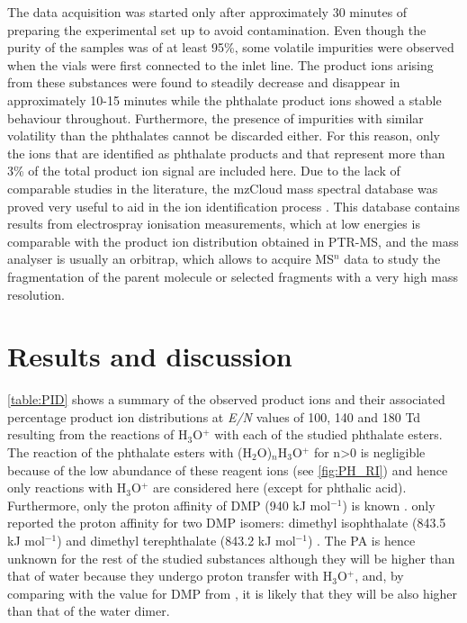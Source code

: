The data acquisition was started only after approximately 30 minutes of preparing the experimental set up to avoid contamination.
%
Even though the purity of the samples was of at least 95\%, some volatile impurities were observed when the vials were first connected to the inlet line.
%
The product ions arising from these substances were found to steadily decrease and disappear in approximately 10-15 minutes while the phthalate product ions showed a stable behaviour throughout.
%
Furthermore, the presence of impurities with similar volatility than the phthalates cannot be discarded either. 
%
For this reason, only the  ions that are identified as phthalate products and that represent more than 3\% of the total product ion signal are included here.
%
Due to the lack of comparable studies in the literature, the mzCloud mass spectral database was proved very useful to aid in the ion identification process \cite{mzcloudd}.
%
 This database contains results from electrospray ionisation measurements, which at low energies is comparable with the product ion distribution obtained in PTR-MS, and the mass analyser is usually an orbitrap, which allows to acquire MS$^n$ data  to study the fragmentation of the parent molecule or selected fragments with a very high mass resolution.%







\section{Results and discussion}
\autoref{table:PID} shows a summary of the observed product ions and their associated percentage product ion distributions at \textit{E/N} values of 100, 140 and 180 Td resulting from the reactions of H$_3$O$^+$ with each of the studied phthalate esters. 
%
The reaction of the phthalate esters with (H$_2$O)$_n$H$_3$O$^+$ for n>0 is negligible because of the low abundance of these reagent ions (see \autoref{fig:PH_RI}) and hence only reactions with H$_3$O$^+$ are considered here (except for phthalic acid).
%
Furthermore, only the proton affinity of DMP (940 kJ mol$^{-1}$) %
is known  \cite{michalczuk2019isomer}. 
%
\citeauthor{doi:10.1063/1.556018}  only reported the proton affinity for two DMP isomers: dimethyl isophthalate (843.5 kJ mol$^{-1}$) and dimethyl terephthalate (843.2 kJ mol$^{-1}$) \cite{doi:10.1063/1.556018}.
%
The PA is hence unknown for the rest of the studied substances although they will  be higher than that of water because they undergo proton transfer with H$_3$O$^+$, and, by comparing with the value for DMP from \citeauthor{michalczuk2019isomer}, it is likely that they will be also higher than that of the water dimer.
 




